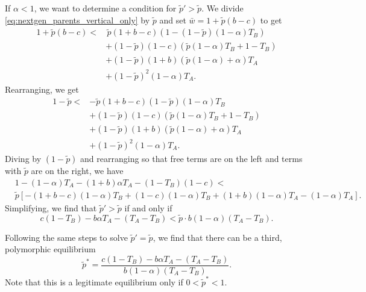 \documentclass[12pt]{extarticle}
\begin{document}
{If $\alpha<1$, we want to determine a condition for $\tilde{p}'>\tilde{p}$. 
We divide \autoref{eq:nextgen_parents_vertical_only} by $\tilde{p}$ and set $\bar{w} = 1 + \tilde{p}(b-c)$ to get
\begin{equation}
\begin{aligned} 
  1 + \tilde{p}(b-c) < 
  & \, \tilde{p}(1+b-c) (1 - (1-\tilde{p}) (1-\alpha) T_B) \\
  & + (1-\tilde{p}) (1-c) (\tilde{p} (1-\alpha) T_B + 1 - T_B) \\
  & + (1-\tilde{p}) (1+b) (\tilde{p} (1-\alpha) + \alpha) T_A \\
  & + (1-\tilde{p})^2 (1-\alpha) T_A .
\end{aligned}
\end{equation}
Rearranging, we get
\begin{equation} 
\begin{aligned} 
  1 - \tilde{p} < 
  & - \tilde{p}(1+b-c)(1-\tilde{p}) (1-\alpha) T_B \\
  & + (1-\tilde{p}) (1-c) (\tilde{p} (1-\alpha) T_B + 1 - T_B) \\
  & + (1-\tilde{p}) (1+b) (\tilde{p} (1-\alpha) + \alpha) T_A \\
  & + (1-\tilde{p})^2 (1-\alpha) T_A .
\end{aligned}
\end{equation}
Diving by $(1-\tilde{p})$ and rearranging so that free terms are on the left and terms with $\tilde{p}$ are on the right, we have
\begin{equation} 
\begin{aligned} 
  &1 - (1-\alpha) T_A - (1+b) \alpha T_A - (1 - T_B)(1-c)  < \\
   &\tilde{p}[ - (1+b-c) (1-\alpha) T_B 
   + (1-c) (1-\alpha) T_B
   + (1+b) (1-\alpha) T_A 
   - (1-\alpha) T_A].
\end{aligned}
\end{equation}
Simplifying, we find that $\tilde{p}'>\tilde{p}$ if and only if
\begin{equation} \label{eq:vert_hori_global_condition}
c(1-T_B) - b \alpha T_A - (T_A-T_B) < \tilde{p} \cdot b (1-\alpha) (T_A-T_B).
\end{equation}

Following the same steps to solve $\tilde{p}'=\tilde{p}$, we find that there can be a third, polymorphic equilibrium 
\begin{equation} \label{eq:vert_hori_equilibrium}
  \tilde{p}^* = 
  \frac{c(1-T_B) - b \alpha T_A - (T_A-T_B)}{b (1-\alpha) (T_A-T_B)} .
\end{equation} 
Note that this is a legitimate equilibrium only if $0<\tilde{p}^*<1$.

}
\end{document}
